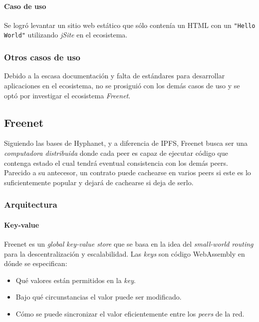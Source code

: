 \paragraph{Caso de uso}

Se logró levantar un sitio web estático que sólo contenía un HTML con un \texttt{"Hello World"} utilizando \textit{jSite} \cite{hyphanet-jsite} en el ecosistema.

\subsubsection{Otros casos de uso}

Debido a la escasa documentación y falta de estándares para desarrollar aplicaciones en el ecosistema, no se prosiguió con los demás casos de uso y se optó por investigar el ecosistema \textit{Freenet}.


\subsection{Freenet}

Siguiendo las bases de Hyphanet, y a diferencia de IPFS, Freenet busca ser una \textit{computadora distribuida} donde cada peer es capaz de ejecutar código que contenga estado el cual tendrá eventual consistencia con los demás peers. Parecido a su antecesor, un contrato puede cachearse en varios peers si este es lo suficientemente popular y dejará de cachearse si deja de serlo.

\subsubsection{Arquitectura}

\paragraph{Key-value}

Freenet es un \textit{global key-value store} que se basa en la idea del \textit{small-world routing} \cite{freenet-small-world-routing} para la descentralización y escalabilidad. Las \textit{keys} son código WebAssembly en dónde se especifican:

\begin{itemize}
    \item Qué valores están permitidos en la \textit{key}.
    \item Bajo qué circunstancias el valor puede ser modificado.
    \item Cómo se puede sincronizar el valor eficientemente entre los \textit{peers} de la red.
\end{itemize}

